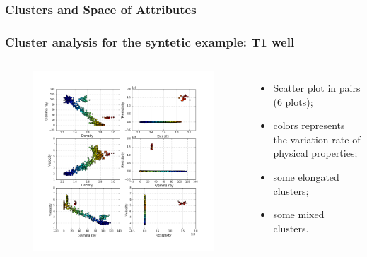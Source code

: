 \documentclass[aspectratio=10]{beamer} %
\begin{document}
\subsubsection{Clusters and Space of Attributes}

\begin{frame}
	\frametitle{Cluster analysis for the syntetic example: T1 well}
	      \begin{columns}
	       	\footnotesize
	       	\justifying
	        \begin{figure}
	       \includegraphics[scale=0.268]{Imagens/cluterpocoT1.png}
	       \end{figure}
	       
	       \begin{itemize}
	       	\footnotesize
	       	\item Scatter plot in pairs ($6$ plots);
	       	\pause
	       	\item colors represents the variation rate of physical properties;
	       	\pause
	       	\item some elongated clusters;
	       	\pause
	       	\item some mixed clusters.
	       \end{itemize}
	       
         \end{columns}
\end{frame}
\end{document}
